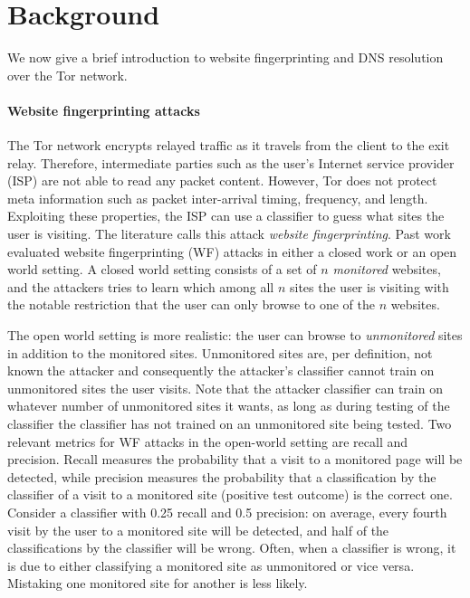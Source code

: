 \section{Background}
\label{sec:background}
We now give a brief introduction to website fingerprinting and DNS resolution
over the Tor network.

\paragraph{Website fingerprinting attacks}
The Tor network encrypts relayed traffic as it travels from the client to the
exit relay.  Therefore, intermediate parties such as the user's Internet service
provider (ISP) are not able to read any packet content.  However, Tor does not
protect meta information such as packet inter-arrival timing, frequency, and
length.  Exploiting these properties, the ISP can use a classifier to guess what
sites the user is visiting.  The literature calls this attack \emph{website
fingerprinting}.  Past work evaluated website fingerprinting (WF) attacks in
either a closed work or an open world setting.
A closed world setting consists of a set
of $n$ \emph{monitored} websites, and the attackers tries to learn which among
all $n$ sites the user is visiting with the notable restriction that the user
can only browse to one of the $n$ websites.

The open world setting is more realistic: the user can browse to
\emph{unmonitored} sites in addition to the monitored sites. Unmonitored sites
are, per definition, not known the attacker and consequently the attacker's
classifier cannot train on unmonitored sites the user visits. Note that the
attacker classifier can train on whatever number of unmonitored sites it wants,
as long as during testing of the classifier the classifier has not trained on
an unmonitored site being tested. Two relevant metrics for WF attacks in the
open-world setting are recall and precision.
Recall measures the probability that a visit to a monitored
page will be detected, while precision measures the probability
that a classification by the classifier of a visit to a monitored
site (positive test outcome) is the correct one. Consider a classifier with
0.25 recall and 0.5 precision: on average, every fourth visit by the user to
a monitored site will be detected, and half of the classifications by the
classifier will be wrong. Often, when a classifier is wrong,
it is due to either classifying a monitored site as unmonitored or vice versa.
Mistaking one monitored site for another is less likely.

